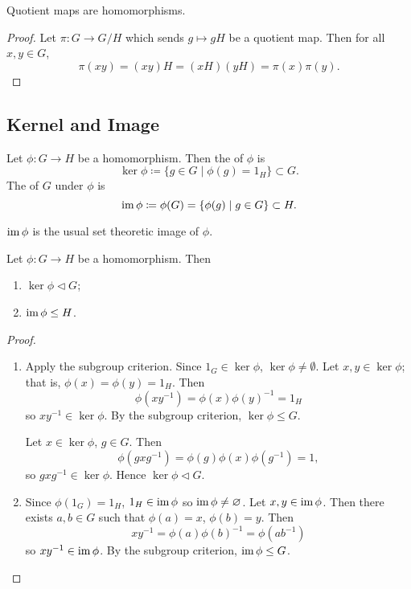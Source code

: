 \begin{proposition}
Quotient maps are homomorphisms.
\end{proposition}

\begin{proof}
Let $\pi:G\to G/H$ which sends $g\mapsto gH$ be a quotient map. Then for all $x,y\in G$,
\[\pi(xy)=(xy)H=(xH)(yH)=\pi(x)\pi(y).\]
\end{proof}

\subsection{Kernel and Image}
\begin{definition}
Let $\phi:G\to H$ be a homomorphism. Then the  of $\phi$ is
\[\ker\phi\coloneqq\{g\in G\mid \phi(g)=1_H\}\subset G.\]
The  of $G$ under $\phi$ is
\[\operatorname{im}\phi\coloneqq\phi(G)=\{\phi(g)\mid g\in G\}\subset H.\]
\end{definition}

\begin{remark}
$\operatorname{im}\phi$ is the usual set theoretic image of $\phi$.
\end{remark}

\begin{proposition}
Let $\phi:G\to H$ be a homomorphism. Then
\begin{enumerate}[label=(\roman*)]
\item $\ker\phi\triangleleft G$;
\item $\operatorname{im}\phi\le H$.
\end{enumerate}
\end{proposition}

\begin{proof} \
\begin{enumerate}[label=(\roman*)]
\item Apply the subgroup criterion. Since $1_G\in\ker\phi$, $\ker\phi\neq\emptyset$. Let $x,y\in\ker\phi$; that is, $\phi(x)=\phi(y)=1_H$. Then
\[\phi(xy^{-1})=\phi(x)\phi(y)^{-1}=1_H\]
so $xy^{-1}\in\ker\phi$. By the subgroup criterion, $\ker\phi\le G$.

Let $x\in\ker\phi$, $g\in G$. Then
\[\phi(gxg^{-1})=\phi(g)\phi(x)\phi(g^{-1})=1,\]
so $gxg^{-1}\in\ker\phi$. Hence $\ker\phi\triangleleft G$.

\item Since $\phi(1_G)=1_H$, $1_H\in\operatorname{im}\phi$ so $\operatorname{im}\phi\neq\varnothing$. Let $x,y\in\operatorname{im}\phi$. Then there exists $a,b\in G$ such that $\phi(a)=x$, $\phi(b)=y$. Then
\[xy^{-1}=\phi(a)\phi(b)^{-1}=\phi(ab^{-1})\]
so $xy^{-1}\in\operatorname{im}\phi$. By the subgroup criterion, $\operatorname{im}\phi\le G$.
\end{enumerate}
\end{proof}

